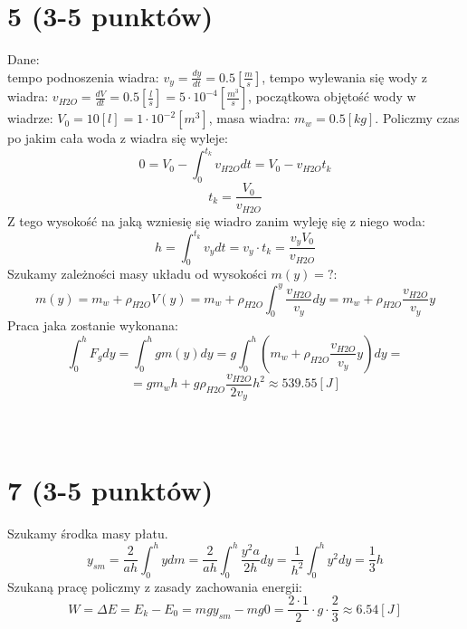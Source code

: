 \documentclass{article}
\title{}
\date{9.04.2020}
\author{Maurycy Borkowski}
\newcommand\tab[1][1cm]{\hspace*{#1}}
\begin{document}
\maketitle

\section{5 (3-5 punktów)}
Dane:\\
\tab tempo podnoszenia wiadra: $v_y = \frac{dy}{dt} = 0.5 [\frac{m}{s}] $,\newline
\tab tempo wylewania się wody z wiadra: $v_{H2O} = \frac{dV}{dt} = 0.5 [\frac{l}{s}] = 5 \cdot 10^{-4} [\frac{m^3}{s}] $,\newline
\tab początkowa objętość wody w wiadrze: $V_0 = 10 [l] = 1\cdot 10^{-2} [m^3]$,\newline
\tab masa wiadra: $m_w = 0.5 [kg]$.\newline\newline
Policzmy czas po jakim cała woda z wiadra się wyleje:
$$
0 = V_0 - \int_0^{t_k} v_{H2O} dt = V_0 - v_{H2O}t_k
$$
$$
t_k = \frac{V_0}{v_{H2O}}
$$
Z tego wysokość na jaką wzniesię się wiadro zanim wyleję się z niego woda:
$$
h = \int_0^{t_k} v_y dt = v_y \cdot t_k = \frac{v_yV_0}{v_{H2O}}
$$
Szukamy zależności masy układu od wysokości $m(y) = ?$:
$$
m(y) = m_w + {\rho}_{H2O} V(y) = m_w + {\rho}_{H2O}\int_0^{y} \frac{v_{H2O}}{v_y} dy = m_w + {\rho}_{H2O}\frac{v_{H2O}}{v_y}y
$$
Praca jaka zostanie wykonana:
$$
\int_0^h F_g dy = \int_0^h gm(y)dy  = g \int_0^h \left( m_w + {\rho}_{H2O}\frac{v_{H2O}}{v_y}y\right)dy =
$$
$$
= gm_wh + g{\rho}_{H2O}\frac{v_{H2O}}{2v_y}h^2 \approx 539.55 [J]
$$
\\\\
\section{7 (3-5 punktów)}
Szukamy środka masy płatu.
$$
y_{sm} = \frac{2}{ah} \int_0^h y dm = \frac{2}{ah}\int_0^{h} \frac{y^2a}{2h}dy = \frac{1}{h^2} \int_0^{h} y^2 dy = \frac{1}{3} h
$$
Szukaną pracę policzmy z zasady zachowania energii:
$$
W = \Delta E = E_k - E_0 = mgy_{sm} - mg0 = \frac{2\cdot1}{2} \cdot g \cdot \frac{2}{3} \approx 6.54 [J]
$$
\end{document}
